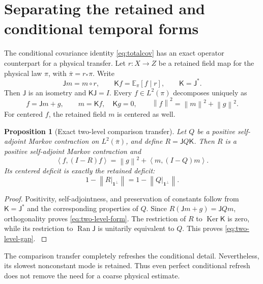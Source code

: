\documentclass[11pt,oneside,openany]{book}
\newtheorem{proposition}[proposition]{Proposition}
\theoremstyle{definition}
\theoremstyle{remark}
\newcommand{\E}{\mathbb E}
\newcommand{\one}{\mathbf1}
\newcommand{\Ran}{\operatorname{Ran}}
\newcommand{\Ker}{\operatorname{Ker}}
\newcommand{\norm}[1]{\left\lVert#1\right\rVert}
\newcommand{\ip}[2]{\left\langle#1,#2\right\rangle}
\newcommand{\src}[2]{\cite[#2]{#1}}
\begin{document}
\section{Separating the retained and conditional temporal forms}
\label{sec:two-level-transfer}
The conditional covariance identity \cref{eq:totalcov} has an exact
operator counterpart for a physical transfer. Let $r:X\to Z$ be a
retained field map for the physical law $\pi$, with
$\overline\pi=r_*\pi$. Write
\[
\mathsf Jm=m\circ r,\qquad
\mathsf Kf=\E_\pi[f\mid r],\qquad \mathsf K=\mathsf J^*.
\]
Then $\mathsf J$ is an isometry and $\mathsf K\mathsf J=I$. Every
$f\in L^2(\pi)$ decomposes uniquely as
\begin{equation}\label{eq:two-level-decomposition}
f=\mathsf Jm+g,\qquad m=\mathsf Kf,\quad \mathsf Kg=0,
\qquad \norm f^2=\norm m^2+\norm g^2.
\end{equation}
For centered $f$, the retained field $m$ is centered as well.

\begin{proposition}[Exact two-level comparison transfer]
\label{prop:two-level-transfer}
Let $Q$ be a positive self-adjoint Markov contraction on
$L^2(\overline\pi)$, and define $R=\mathsf JQ\mathsf K$.
Then $R$ is a positive self-adjoint Markov contraction and
\begin{equation}\label{eq:two-level-form}
\ip{f}{(I-R)f}=\norm g^2+\ip{m}{(I-Q)m}.
\end{equation}
Its centered deficit is exactly the retained deficit:
\begin{equation}\label{eq:two-level-gap}
1-\norm{R|_{\one^\perp}}
=1-\norm{Q|_{\one^\perp}}.
\end{equation}
\end{proposition}
\begin{proof}
Positivity, self-adjointness, and preservation of constants follow
from $\mathsf K=\mathsf J^*$ and the corresponding properties of $Q$.
Since $R(\mathsf Jm+g)=\mathsf JQm$, orthogonality proves
\cref{eq:two-level-form}. The restriction of $R$ to $\Ker\mathsf K$
is zero, while its restriction to $\Ran\mathsf J$ is unitarily
equivalent to $Q$. This proves \cref{eq:two-level-gap}.
\src{F6}{V56}
\end{proof}

The comparison transfer completely refreshes the conditional detail.
Nevertheless, its slowest nonconstant mode is retained. Thus even
perfect conditional refresh does not remove the need for a coarse
physical estimate.
\end{document}
